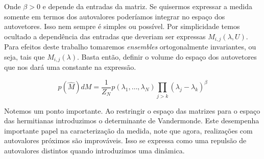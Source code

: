 Onde $\beta > 0$ e depende da entradas da matriz. Se quisermos expressar a medida somente em termos dos autovalores poderíamos integrar no espaço dos autovetores. Isso nem sempre é simples ou possível. Por simplicidade temos ocultado a dependência das entradas que deveriam ser expressas $M_{i,j}(\lambda, U)$.  Para efeitos deste trabalho tomaremos \textit{ensembles} ortogonalmente invariantes, ou seja, tais que $M_{i,j}(\lambda)$. Basta então, definir o volume do espaço dos autovetores que nos dará uma constante na expressão.

\begin{equation}
	p(\hat{M}) dM =  \frac{1}{Z_N} p(\lambda_1, \dots, \lambda_N) \prod_{j>k} (\lambda_j - \lambda_{k})^\beta
\end{equation}


Notemos um ponto importante. Ao restringir o espaço das matrizes para o espaço das hermitianas introduzimos o determinante de Vandermonde. Este desempenha importante papel na caracterização da medida, note que agora, realizações com autovalores próximos são improváveis. Isso se expressa como uma repulsão de autovalores distintos quando introduzimos uma dinâmica.